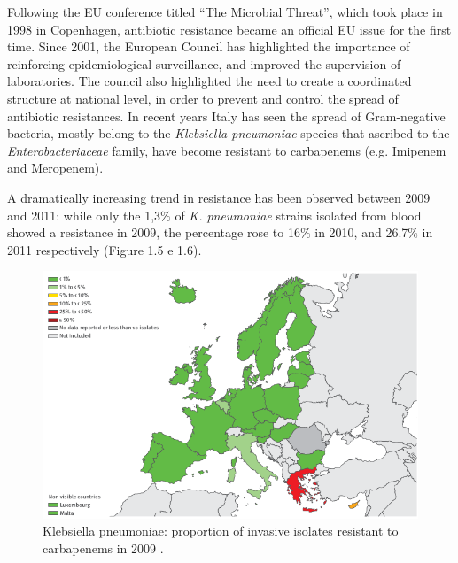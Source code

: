 \documentclass[11pt]{report}
\begin{document}
\clearpage
Following the EU conference titled “The Microbial Threat”, which took place in 1998 in Copenhagen, antibiotic resistance became an official EU issue for the first time.
Since 2001, the European Council has highlighted the importance of reinforcing epidemiological surveillance, and improved the supervision of laboratories. The council also highlighted the need to create a coordinated structure at national level, in order to prevent and control the spread of antibiotic resistances.
In recent years Italy has seen the spread of Gram-negative bacteria, mostly belong to the \emph{Klebsiella pneumoniae} species that ascribed to the \emph{Enterobacteriaceae} family, have become resistant to carbapenems (e.g. Imipenem and Meropenem).

A dramatically increasing trend in resistance has been observed between 2009 and 2011: while only the 1,3$\%$ of \emph{K. pneumoniae} strains isolated from blood showed a resistance in 2009, the percentage rose to 16$\%$ in 2010, and 26.7$\%$ in 2011 respectively (Figure 1.5 e 1.6).

\begin{figure}[htp]
\centering
\includegraphics[scale=0.60]{img/K.pneu_2009.png}
\caption{Klebsiella pneumoniae: proportion of invasive isolates resistant to carbapenems in 2009 \cite{ECDC_Surveillance}.}
\label{}
\end{figure}
\end{document}

